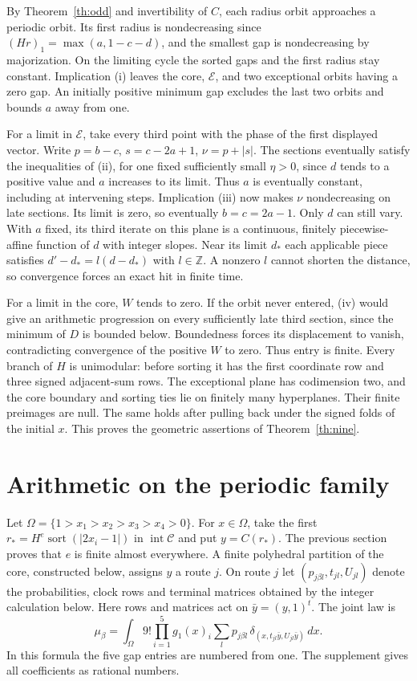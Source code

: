\documentclass[11pt,reqno]{amsart}
\newcommand{\sort}{\operatorname{sort}}
\newcommand{\ii}{\operatorname{int}}
\newcommand{\ZZ}{\mathbb Z}
\begin{document}
By Theorem~\ref{th:odd} and invertibility of $C$, each radius orbit approaches
a periodic orbit. Its first radius is nondecreasing since $(Hr)_1=\max(a,1-c-d)$,
and the smallest gap is nondecreasing by majorization. On the limiting cycle
the sorted gaps and the first radius stay constant. Implication (i) leaves the
core, $\mathcal E$, and two exceptional orbits having a zero gap. An initially
positive minimum gap excludes the last two orbits and bounds $a$ away from one.

For a limit in $\mathcal E$, take every third point with the phase of the first
displayed vector. Write $p=b-c$, $s=c-2a+1$, $\nu=p+|s|$. The sections
eventually satisfy the inequalities of (ii), for one fixed sufficiently small
$\eta>0$, since $d$ tends to a positive value and $a$ increases to its limit.
Thus $a$ is eventually constant, including at intervening steps. Implication
(iii) now makes $\nu$ nondecreasing on late sections. Its limit is zero, so
eventually $b=c=2a-1$. Only $d$ can still vary. With $a$ fixed, its third
iterate on this plane is a continuous, finitely piecewise-affine function
of $d$ with integer slopes. Near its limit $d_*$ each applicable piece
satisfies $d'-d_*=l(d-d_*)$ with $l\in\ZZ$. A nonzero $l$ cannot shorten
the distance, so convergence forces an exact hit in finite time.

For a limit in the core, $W$ tends to zero. If the orbit never entered,
(iv) would give an arithmetic progression on every sufficiently late third
section, since the minimum of $D$ is bounded below. Boundedness forces
its displacement to vanish, contradicting convergence of the positive $W$
to zero. Thus entry is finite. Every branch of $H$ is unimodular: before
sorting it has the first coordinate row and three signed adjacent-sum rows.
The exceptional plane has codimension two, and the core boundary and sorting
ties lie on finitely many hyperplanes. Their finite preimages are null.
The same holds after pulling back under the signed folds of the initial $x$.
This proves the geometric assertions of Theorem~\ref{th:nine}.

\section{Arithmetic on the periodic family}\label{sec:law}
Let $\Omega=\{1>x_1>x_2>x_3>x_4>0\}$. For $x\in\Omega$, take the first
$r_*=H^e\sort(|2x_i-1|)$ in $\ii\mathcal C$ and put $y=C(r_*)$. The
previous section proves that $e$ is finite almost everywhere. A finite
polyhedral partition of the core, constructed below, assigns $y$ a route
$j$. On route $j$ let $(p_{j\beta l},t_{jl},U_{jl})$ denote the probabilities,
clock rows and terminal matrices obtained by the integer calculation below.
Here rows and matrices act on $\bar y=(y,1)^t$. The joint law is
\begin{equation}\label{eq:law}
 \mu_\beta=\int_\Omega 9!\prod_{i=1}^{5}g_1(x)_i
 \sum_l p_{j\beta l}\,\delta_{(x,t_{jl}\bar y,U_{jl}\bar y)}\,dx .
\end{equation}
In this formula the five gap entries are numbered from one.
The supplement gives all coefficients as rational numbers.
\end{document}
